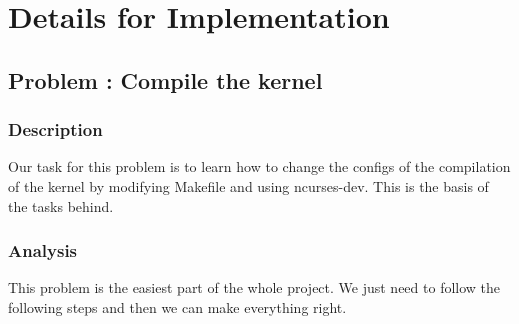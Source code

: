\documentclass[12pt,a4paper,UTF8]{article}
\theoremstyle{definition}
\numberwithin{equation}{section}
\numberwithin{figure}{section}
\begin{document}
\newpage
\section{Details for Implementation}
\subsection{Problem \uppercase\expandafter{} : Compile the kernel}
\subsubsection{Description}
Our task for this problem is to learn how to change the configs of the compilation of the kernel by modifying Makefile and using ncurses-dev. This is the basis of the tasks behind.
\subsubsection{Analysis}
This problem is the easiest part of the whole project. We just need to follow the following steps and then we can make everything right.
\end{document}
